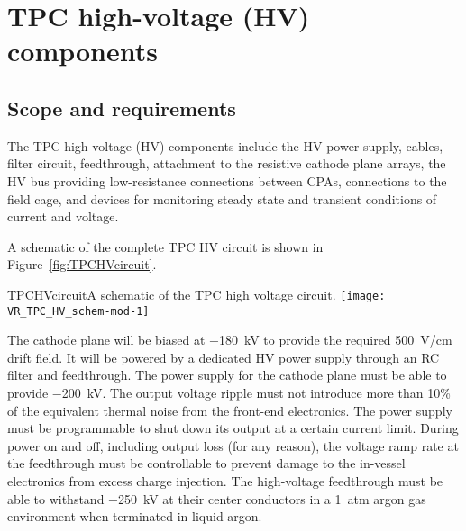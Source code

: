 




\section{TPC high-voltage (HV) components}

\subsection{Scope and requirements}

The TPC high voltage (HV) components include the HV power supply, cables,
filter circuit, feedthrough, attachment to the resistive cathode plane
arrays, the HV bus providing low-resistance connections between CPAs,
connections to the field cage, and devices for monitoring steady state
and transient conditions of current and voltage.

A schematic of the complete TPC HV circuit is shown in Figure~\ref{fig:TPCHVcircuit}.

\begin{cdrfigure}{TPCHVcircuit}{A schematic of the TPC high voltage circuit.}
  \texttt{[image: VR\_TPC\_HV\_schem-mod-1]}
\end{cdrfigure}


The cathode plane will be biased at \SI{-180}{kV} to provide the
required \SI{500}{V/cm} drift field.  It will be
powered by a dedicated HV power supply through an RC filter and
feedthrough.  The power supply for the cathode plane must be able
to provide \SI{-200}{kV}.  The output voltage
ripple must not introduce more than 10\% %
of the equivalent thermal
noise from the front-end electronics. The power supply must be
programmable to shut down its output at a certain current
limit. During power on and off, including output loss (for any
reason), the voltage ramp rate at the feedthrough must be controllable
to prevent damage to the in-vessel electronics from excess charge
injection. The high-voltage feedthrough must be able to withstand \SI{-250}{kV}
at their center conductors in a \SI{1}{atm} argon gas environment when
terminated in liquid argon.

